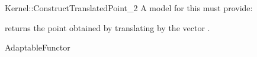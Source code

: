 \begin{ccRefFunctionObjectConcept}{Kernel::ConstructTranslatedPoint_2}
A model for this must provide:


       {returns the point obtained by translating  by the vector 
        .}

\ccRefines
AdaptableFunctor

\ccSeeAlso
{}\\

\end{ccRefFunctionObjectConcept}
